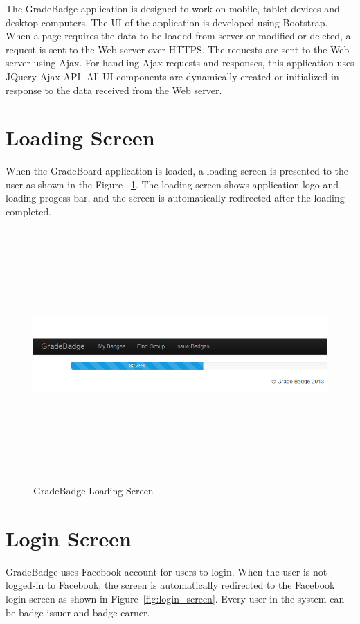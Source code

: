 
The GradeBadge application is designed to work on mobile, tablet devices and desktop computers. The UI of the application is developed using Bootstrap. When a page requires the data to be loaded from server or modified or deleted, a request is sent to the Web server over  HTTPS. The requests are sent to the Web server using Ajax. For handling Ajax requests and responses, this application uses JQuery Ajax API. All UI components are dynamically created or initialized in response to the data received from the Web server.

\newpage
\section{Loading Screen}
When the GradeBoard application is loaded, a loading screen is presented to the user as shown in the Figure ~\ref{fig:loading_screen}. The loading screen shows application logo and loading progess bar, and the screen is automatically redirected after the loading completed. 

\vspace{3em}
\begin{figure}[H]
\begin{center}
\includegraphics[height=3.8in,width=6.5in]{images/loading-screen.jpg}
\caption{GradeBadge Loading Screen}
\label{fig:loading_screen}
\end{center}
\end{figure}

\newpage
\section{Login Screen}
GradeBadge uses Facebook account for users to login. When the user is not logged-in to Facebook, the screen is automatically redirected to the Facebook login screen as shown in Figure~\ref{fig:login_screen}. Every user in the system can be badge issuer and badge earner.

